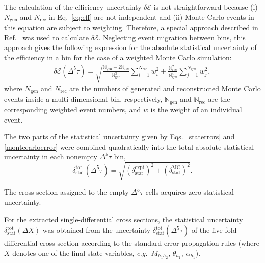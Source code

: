 \documentclass[prc,twocolumn,superscriptaddress,showpacs,amssymb,amsmath,amsfonts,aps,nofootinbib]{revtex4-1}
\begin{document}
The calculation of the efficiency uncertainty $\delta \mathcal{E}$ is not straightforward because (i) $N_{\text{gen}}$ and $N_{\text{rec}}$ in Eq.\!~\eqref{eq:eff} are not independent and (ii) Monte Carlo events in this equation are subject to weighting. Therefore, a special approach described in Ref.\!~\cite{Laforge:1996ts} was used to calculate $\delta \mathcal{E}$. Neglecting event migration between bins, this approach gives the following expression for the absolute statistical uncertainty of the efficiency in a bin for the case of a weighted Monte Carlo simulation:
\begin{equation}
\begin{aligned}
\delta \mathcal{E}(\Delta^{5} \tau) = \sqrt{\frac{\mathbb{N}_{\text{gen}} - 2\mathbb{N}_{\text{rec}}}{\mathbb{N}_{\text{gen}}^{3}}\sum\limits_{i=1}^{N_{\text{rec}}} w_{i}^{2} + \frac{\mathbb{N}_{\text{rec}}^{2}}{\mathbb{N}_{\text{gen}}^{4}}\sum\limits_{j=1}^{N_{\text{gen}}} w_{j}^{2}},
\end{aligned}
\label{eq:eff_err_weighted}
\end{equation}
where $N_{\text{gen}}$ and $N_{\text{rec}}$ are the numbers of generated and reconstructed Monte Carlo events inside a multi-dimensional bin, respectively, $\mathbb{N}_{\text{gen}}$ and  $\mathbb{N}_{\text{rec}}$ are the corresponding weighted event numbers, and $w$ is the weight of an individual event.


The two parts of the statistical uncertainty given by Eqs.\!~\eqref{staterrors} and \eqref{montecarloerror} were combined quadratically into the total absolute statistical uncertainty in each nonempty $\Delta^{5} \tau$ bin,
\begin{equation}
\delta_{\text{stat}}^{\text{tot}}(\Delta^{5} \tau) =
\sqrt{\left (\delta_{\text{stat}}^{\text{expt}} \right )^{2} + \left (\delta_{\text{stat}}^{\text{MC}}\right )^{2}}.
\label{errortot}
\end{equation}

The cross section assigned to the empty $\Delta^{5} \tau$ cells acquires zero statistical uncertainty.

For the extracted  single-differential cross sections, the statistical uncertainty $\delta_{\text{stat}}^{\text{tot}}(\Delta X)$ was obtained from the uncertainty  $\delta_{\text{stat}}^{\text{tot}}(\Delta^{5} \tau)$ of the five-fold differential cross section according to the standard error propagation rules (where $X$ denotes one of the final-state variables, {\it e.g.}~$M_{h_{1}h_{2}}$, $\theta_{h_1}$, $\alpha_{h_1}$).
\end{document}
